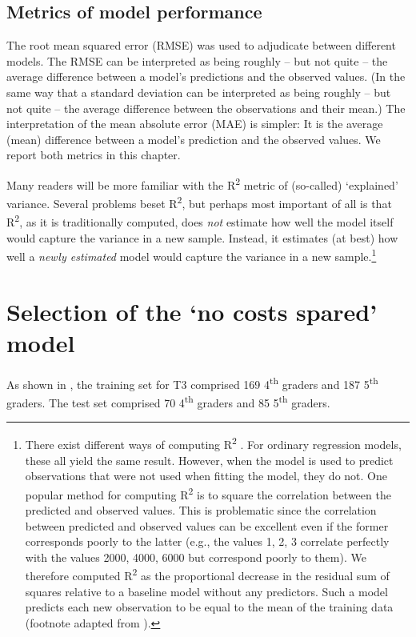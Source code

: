 \documentclass[output=paper]{langsci/langscibook}
\begin{document}
\subsection{Metrics of model performance}

The root mean squared error (RMSE) was used to adjudicate between different models. The RMSE can be interpreted as being roughly – but not quite – the average difference between a model’s predictions and the observed values. (In the same way that a standard deviation can be interpreted as being roughly – but not quite – the average difference between the observations and their mean.) The interpretation of the mean absolute error (MAE) is simpler: It is the average (mean) difference between a model’s prediction and the observed values. We report both metrics in this chapter.

Many readers will be more familiar with the R\textsuperscript{2} metric of (so-called) ‘explained’ variance. Several problems beset R\textsuperscript{2}, but perhaps most important of all is that R\textsuperscript{2}, as it is traditionally computed, does \textit{not} estimate how well the model itself would capture the variance in a new sample. Instead, it estimates (at best) how well a \textit{newly estimated} model would capture the variance in a new sample.\footnote{There exist different ways of computing R\textsuperscript{2} \citep{Kvålseth1985}. For ordinary regression models, these all yield the same result. However, when the model is used to predict observations that were not used when fitting the model, they do not. One popular method for computing R\textsuperscript{2} is to square the correlation between the predicted and observed values. This is problematic since the correlation between predicted and observed values can be excellent even if the former corresponds poorly to the latter (e.g., the values 1, 2, 3 correlate perfectly with the values 2000, 4000, 6000 but correspond poorly to them). We therefore computed R\textsuperscript{2} as the proportional decrease in the residual sum of squares relative to a baseline model without any predictors. Such a model predicts each new observation to be equal to the mean of the training data (footnote adapted from \citealt{VanhoveEtAl2019}).}

\section{Selection of the ‘no costs spared’ model}

As shown in , the training set for T3 comprised 169 4\textsuperscript{th} graders and 187 5\textsuperscript{th} graders. The test set comprised 70 4\textsuperscript{th} graders and 85 5\textsuperscript{th} graders.
\end{document}
